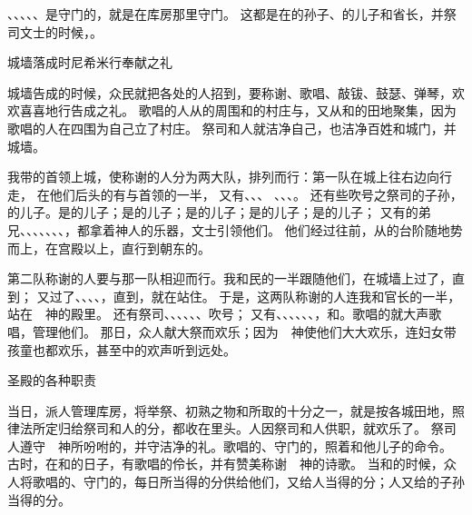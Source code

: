 {、{}、{}、{}、{}、{}是守门的，就是在库房那里守门。
这都是在{}的孙子、{}的儿子{}和省长{}，并祭司文士{}的时候，{}。
\par }{\SH 城墙落成时尼希米行奉献之礼
\par }{\PP {}城墙告成的时候，众民就把各处的{}人招到{}，要称谢、歌唱、敲钹、鼓瑟、弹琴，欢欢喜喜地行告成之礼。
歌唱的人从{}的周围和{}的村庄与{}，又从{}和{}的田地聚集，因为歌唱的人在{}四围为自己立了村庄。
祭司和{}人就洁净自己，也洁净百姓和城门，并城墙。
\par }{\PP {}我带{}的首领上城，使称谢的人分为两大队，排列而行：第一队在城上往右边向{}行走，
在他们后头的有{}与{}首领的一半，
又有{}、{}、{}、
、{}、{}、{}。
还有些吹号之祭司的子孙，{}的儿子{}。{}是{}的儿子；{}是{}的儿子；{}是{}的儿子；{}是{}的儿子；{}是{}的儿子；
又有{}的弟兄{}、{}、{}、{}、{}、{}、{}、{}，都拿着神人{}的乐器，文士{}引领他们。
他们经过{}往前，从{}的台阶随地势而上，在{}宫殿以上，直行到朝东的{}。
\par }{\PP {}第二队称谢的人要与那一队相迎而行。我和民的一半跟随他们，在城墙上过了{}，直到{}；
又过了{}、{}、{}、{}、{}，直到{}，就在{}站住。
于是，这两队称谢的人连我和官长的一半，站在　神的殿里。
还有祭司{}、{}、{}、{}、{}、{}、{}吹号；
又有{}、{}、{}、{}、{}、{}、{}，和{}{}。歌唱的就大声歌唱，{}管理他们。
那日，众人献大祭而欢乐；因为　神使他们大大欢乐，连妇女带孩童也都欢乐，甚至{}中的欢声听到远处。
\par }{\SH 圣殿的各种职责
\par }{\PP {}当日，派人管理库房，将举祭、初熟之物和所取的十分之一，就是按各城田地，照律法所定归给祭司和{}人的分，都收在里头。{}人因祭司和{}人供职，就欢乐了。
祭司{}人遵守　神所吩咐的，并守洁净的礼。歌唱的、守门的，照着{}和他儿子{}的命令{}。
古时，在{}和{}的日子，有歌唱的伶长，并有赞美称谢　神的诗歌。
当{}和{}的时候，{}众人将歌唱的、守门的，每日所当得的分供给他们，又给{}人当得的分；{}人又给{}的子孙当得的分。

}
